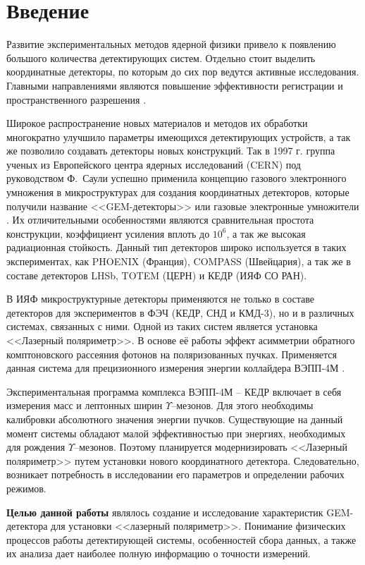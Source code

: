 \chapter*{Введение}
\label{sec:intro}
Развитие экспериментальных методов ядерной физики привело к появлению большого количества детектирующих систем. Отдельно стоит выделить координатные детекторы, по которым до сих пор ведутся активные исследования. Главными направлениями являются повышение эффективности регистрации и пространственного разрешения \cite{shechtman}.
\par Широкое распространение новых материалов и методов их обработки многократно улучшило параметры имеющихся детектирующих устройств, а так же позволило создавать детекторы новых конструкций. Так в 1997 г. группа ученых из Европейского центра ядерных исследований (CERN) под руководством Ф.~Саули успешно применила концепцию газового электронного умножения в микроструктурах для создания координатных детекторов, которые получили название <<GEM-детекторы>> или газовые электронные умножители \cite{sauli}. Их отличительными особенностями являются сравнительная простота конструкции, коэффициент усиления вплоть до $10^6$, а так же высокая радиационная стойкость. Данный тип детекторов широко используется в таких экспериментах, как PHOENIX (Франция), COMPASS (Швейцария), а так же в составе детекторов LHSb, TOTEM (ЦЕРН) и КЕДР (ИЯФ СО РАН).
\par В ИЯФ микроструктурные детекторы применяются не только в составе детекторов для экспериментов в ФЭЧ (КЕДР, СНД и КМД-3), но и в различных системах, связанных с ними. Одной из таких систем является установка <<Лазерный поляриметр>>. В основе её работы эффект асимметрии обратного комптоновского рассеяния фотонов на поляризованных пучках. Применяется данная система для прецизионного измерения энергии коллайдера ВЭПП-4М \cite{nikitin-nikolaev}.
\par Экспериментальная программа комплекса ВЭПП-4М -- КЕДР включает в себя измерения масс и лептонных ширин $\Upsilon$--мезонов. Для этого необходимы калибровки абсолютного значения энергии пучков. Существующие на данный момент системы обладают малой эффективностью при энергиях, необходимых для рождения $\Upsilon$--мезонов. Поэтому планируется модернизировать <<Лазерный поляриметр>> путем установки нового координатного детектора. Следовательно, возникает потребность в исследовании его параметров и определении рабочих режимов.
\par \textbf{Целью данной работы} являлось создание и исследование характеристик GEM-детектора для установки <<лазерный поляриметр>>. Понимание физических процессов работы детектирующей системы, особенностей сбора данных, а также их анализа дает наиболее полную информацию о точности измерений.  
